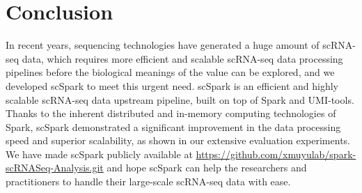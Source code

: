 \documentclass[conference]{IEEEtran}
\begin{document}

\section{Conclusion}

In recent years, sequencing technologies have generated a huge amount of scRNA-seq data, which requires more efficient and scalable scRNA-seq data processing pipelines before the biological meanings of the value can be explored, and we developed scSpark to meet this urgent need. 
scSpark is an efficient and highly scalable scRNA-seq data upstream pipeline, built on top of Spark and UMI-tools.
Thanks to the inherent distributed and in-memory computing technologies of Spark, scSpark demonstrated a significant improvement in the data processing speed and superior scalability, as shown in our extensive evaluation experiments. 
We have made scSpark publicly available at \url{https://github.com/xmuyulab/spark-scRNASeq-Analysis.git} and hope scSpark can help the researchers and practitioners to handle their large-scale scRNA-seq data with ease. 




\end{document}
